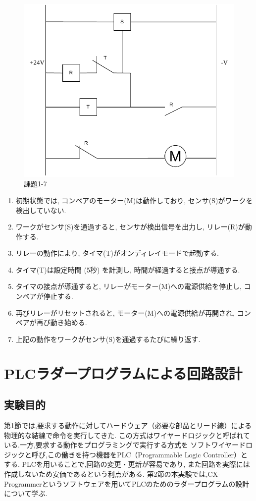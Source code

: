 \begin{figure}[H]
  \centering
  \includegraphics[scale=0.7]{sozai/20.pdf}
  \caption{課題1-7}
\end{figure}

\begin{enumerate}
  \item 初期状態では, コンベアのモーター(M)は動作しており, センサ(S)がワークを検出していない.
  \item ワークがセンサ(S)を通過すると, センサが検出信号を出力し, リレー(R)が動作する.
  \item リレーの動作により, タイマ(T)がオンディレイモードで起動する.
  \item タイマ(T)は設定時間 (5秒) を計測し, 時間が経過すると接点が導通する.
  \item タイマの接点が導通すると, リレーがモーター(M)への電源供給を停止し, コンベアが停止する.
  \item 再びリレーがリセットされると, モーター(M)への電源供給が再開され, コンベアが再び動き始める.
  \item 上記の動作をワークがセンサ(S)を通過するたびに繰り返す.
\end{enumerate}



\section{PLCラダープログラムによる回路設計}

\subsection{実験目的}
第1節では,要求する動作に対してハードウェア（必要な部品とリード線）による物理的な結線で命令を実行してきた.
この方式はワイヤードロジックと呼ばれている.一方,要求する動作をプログラミングで実行する方式を
ソフトワイヤードロジックと呼び,この働きを持つ機器をPLC（Programmable Logic Controller）とする.
PLCを用いることで,回路の変更・更新が容易であり,
また回路を実際には作成しないため安価であるという利点がある.
第2節の本実験では,CX-Programmerというソフトウェアを用いてPLCのためのラダープログラムの設計について学ぶ.


